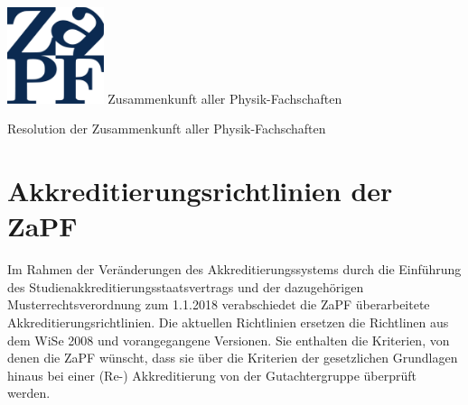 \documentclass[DIV=calc]{scrartcl}
\begin{document}
    \hspace{0.87\textwidth}
    \begin{minipage}{120pt}
        \vspace{-1.8cm}
        \includegraphics[width=80pt]{logo.pdf}
        \centering
        \small Zusammenkunft aller Physik-Fachschaften
    \end{minipage}
    \begin{center}
        \huge{Resolution der Zusammenkunft aller Physik-Fachschaften}\vspace{.25\baselineskip}\\
        \normalsize
    \end{center}
   \vspace{0.5cm}
\section*{Akkreditierungsrichtlinien der ZaPF}
Im Rahmen der Veränderungen des Akkreditierungssystems durch die Einführung des Studienakkreditierungsstaatsvertrags und der dazugehörigen Musterrechtsverordnung zum 1.1.2018 verabschiedet die ZaPF überarbeitete Akkreditierungsrichtlinien. Die aktuellen Richtlinien ersetzen die Richtlinen aus dem WiSe 2008 und vorangegangene Versionen. Sie enthalten die Kriterien, von denen die ZaPF wünscht, dass sie über die Kriterien der gesetzlichen Grundlagen hinaus bei einer (Re-) Akkreditierung von der Gutachtergruppe überprüft werden.
\end{document}
